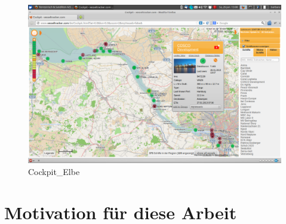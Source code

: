 \begin{figure}[H]
  \centering
  \includegraphics[width=6in]{images/Cockpit_Elbe}
  \caption[Cockpit\_Elbe]{Cockpit\_Elbe}
\end{figure}

\section{Motivation für diese Arbeit}\label{s.Motivation für diese Arbeit}

